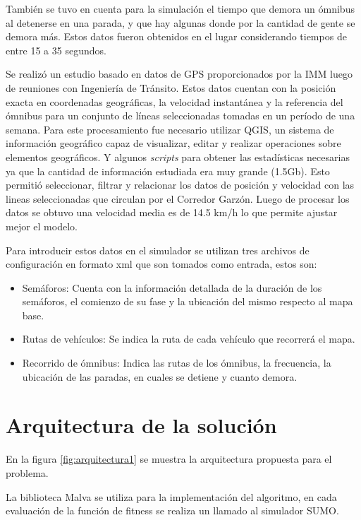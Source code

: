 También se tuvo en cuenta para la simulación el tiempo que demora un ómnibus al detenerse en una parada, y que hay algunas donde por la cantidad de gente se demora más. Estos datos fueron obtenidos en el lugar considerando tiempos de entre 15 a 35 segundos.

Se realizó un estudio basado en datos de GPS proporcionados por la IMM luego de reuniones con Ingeniería de Tránsito. Estos datos cuentan con la posición exacta en coordenadas geográficas, la velocidad instantánea y la referencia del ómnibus para un conjunto de líneas seleccionadas tomadas en un período de una semana. 
Para este procesamiento fue necesario utilizar QGIS, un sistema de información geográfico capaz de visualizar, editar y realizar operaciones sobre elementos geográficos. Y algunos \emph{scripts} para obtener las estadísticas necesarias ya que la cantidad de información estudiada era muy grande (1.5Gb). Esto permitió seleccionar, filtrar y relacionar los datos de posición y velocidad con las lineas seleccionadas que circulan por el Corredor Garzón. Luego de procesar los datos se obtuvo una velocidad media es de 14.5 km/h lo que permite ajustar mejor el modelo. 

Para introducir estos datos en el simulador se utilizan tres archivos de configuración en formato xml que son tomados como entrada, estos son:

\begin{itemize}
	\item Semáforos: Cuenta con la información detallada de la duración de los semáforos, el comienzo de su fase y la ubicación del mismo respecto al mapa base.
	\item Rutas de vehículos: Se indica la ruta de cada vehículo que recorrerá el mapa.
	\item Recorrido de ómnibus: Indica las rutas de los ómnibus, la frecuencia, la ubicación de las paradas, en cuales se detiene y cuanto demora.
\end{itemize}




\section{Arquitectura de la solución}

En la figura \ref{fig:arquitectura1} se muestra la arquitectura propuesta para el problema.

La biblioteca Malva se utiliza para la implementación del algoritmo, en cada evaluación de la función de fitness se realiza un llamado al simulador SUMO. 

